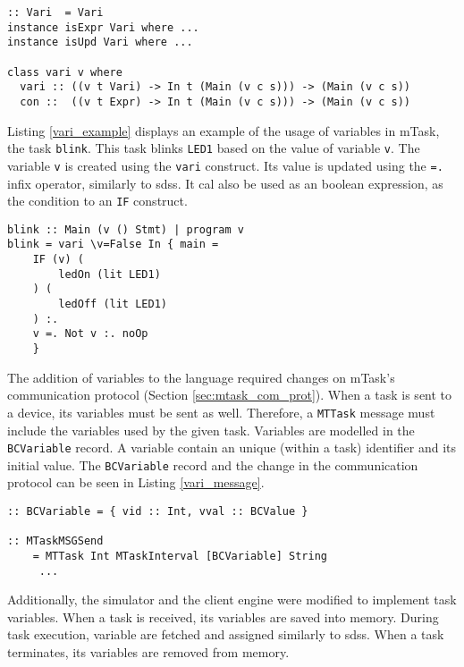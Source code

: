 \begin{lstlisting}[caption=The \texttt{vari} class,captionpos=b,label=vari_class]
:: Vari  = Vari
instance isExpr Vari where ...
instance isUpd Vari where ...

class vari v where
  vari :: ((v t Vari) -> In t (Main (v c s))) -> (Main (v c s)) 
  con ::  ((v t Expr) -> In t (Main (v c s))) -> (Main (v c s))
\end{lstlisting}

Listing \ref{vari_example} displays an example of the usage of variables in \gls{mTask}, the task \texttt{blink}. This task blinks \texttt{LED1} based on the value of variable \texttt{v}. The variable \texttt{v} is created using the \texttt{vari} construct. Its value is updated using the \texttt{=.} infix operator, similarly to \acp{sds}. It cal also be used as an boolean expression, as the condition to an \texttt{IF} construct.

\begin{lstlisting}[caption=Example of the usage of variables in mTask,captionpos=b,label=vari_example]
blink :: Main (v () Stmt) | program v
blink = vari \v=False In { main =
	IF (v) (
		ledOn (lit LED1)
	) (
		ledOff (lit LED1)
	) :.
	v =. Not v :. noOp
	}
\end{lstlisting}

The addition of variables to the language required changes on \gls{mTask}'s communication protocol (Section \ref{sec:mtask_com_prot}). When a task is sent to a device, its variables must be sent as well. Therefore, a \texttt{MTTask} message must include the variables used by the given task. Variables are modelled in the \texttt{BCVariable} record. A variable contain an unique (within a task) identifier and its initial value. The \texttt{BCVariable} record and the change in the communication protocol can be seen in Listing \ref{vari_message}.

\begin{lstlisting}[caption=Changes in mTask's communication protocol to accommodate task variables,captionpos=b,label=vari_message]
:: BCVariable = { vid :: Int, vval :: BCValue }

:: MTaskMSGSend
	= MTTask Int MTaskInterval [BCVariable] String
	 ...
\end{lstlisting}

Additionally, the simulator and the client engine were modified to implement task variables. When a task is received, its variables are saved into memory. During task execution, variable are fetched and assigned similarly to \acp{sds}. When a task terminates, its variables are removed from memory.

